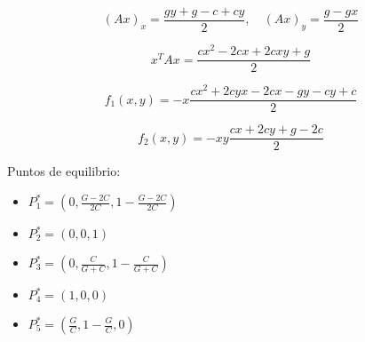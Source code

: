 \documentclass[twocolumn,aps,prl]{revtex4-1}
\begin{document}
$$(Ax)_x = \frac{gy+g-c+cy}{2}
,\quad 
(Ax)_y = \frac{g-gx}{2}
$$

$$
x^T Ax = \frac{cx^2-2cx+2cxy+g}{2}
$$

$$
f_1(x, y) = 
-x \frac{
    cx^2
    + 2cyx
    - 2cx
    - gy
    - cy
    + c
    }{2}
$$

$$
f_2(x, y) = 
-xy \frac{cx+2cy+g-2c}{2}
$$



Puntos de equilibrio:

\begin{itemize}
    \item[] $P_1^* = (0, \frac{G-2C}{2C}, 1 - \frac{G-2C}{2C})$
    \item[] $P_2^* = (0, 0, 1)$
    \item[] $P_3^* = (0, \frac{C}{G+C}, 1 - \frac{C}{G+C})$
    \item[] $P_4^* = (1, 0, 0)$
    \item[] $P_5^* = (\frac{G}{C}, 1- \frac{G}{C}, 0)$
\end{itemize}


\end{document}

